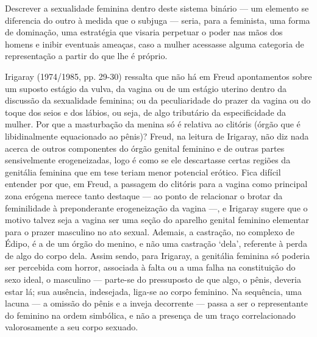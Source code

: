 Descrever a sexualidade feminina dentro deste sistema binário --- um
elemento se diferencia do outro à medida que o subjuga --- seria, para a
feminista, uma forma de dominação, uma estratégia que visaria perpetuar
o poder nas mãos dos homens e inibir eventuais ameaças, caso a mulher
acessasse alguma categoria de representação a partir do que lhe é
próprio.

Irigaray (1974/1985, pp. 29-30) ressalta que não há em Freud
apontamentos sobre um suposto estágio da vulva, da vagina ou de um
estágio uterino dentro da discussão da sexualidade feminina; ou da
peculiaridade do prazer da vagina ou do toque dos seios e dos lábios, ou
seja, de algo tributário da especificidade da mulher. Por que a
masturbação da menina só é relativa ao clitóris (órgão que é
libidinalmente equacionado ao pênis)? Freud, na leitura de Irigaray, não
diz nada acerca de outros componentes do órgão genital feminino e de
outras partes sensivelmente erogeneizadas, logo é como se ele
descartasse certas regiões da genitália feminina que em tese teriam
menor potencial erótico. Fica difícil entender por que, em Freud, a
passagem do clitóris para a vagina como principal zona erógena merece
tanto destaque --- ao ponto de relacionar o brotar da feminilidade à
preponderante erogeneização da vagina ---, e Irigaray sugere que o
motivo talvez seja a vagina ser uma seção do aparelho genital feminino
elementar para o prazer masculino no ato sexual. Ademais, a castração,
no complexo de Édipo, é a de um órgão do menino, e não uma castração
`dela', referente à perda de algo do corpo dela. Assim sendo, para
Irigaray, a genitália feminina só poderia ser percebida com horror,
associada à falta ou a uma falha na constituição do sexo ideal, o
masculino --- parte-se do pressuposto de que algo, o pênis, deveria estar
lá; sua ausência, indesejada, liga-se ao corpo feminino. Na sequência,
uma lacuna --- a omissão do pênis e a inveja decorrente --- passa a ser o
representante do feminino na ordem simbólica, e não a presença de um
traço correlacionado valorosamente a seu corpo sexuado.

